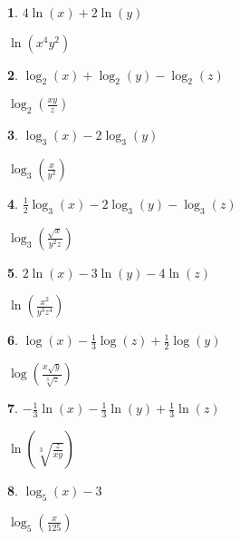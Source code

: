 \documentclass{amsbook}
\newtheorem{exc}{}
\newenvironment{ex}{\begin{exc}\normalfont}{\end{exc}}
\numberwithin{section}{chapter}
\numberwithin{equation}{chapter}
\begin{document}
\begin{multicols}{2}

\begin{ex}
	$4\ln(x) + 2\ln(y)$ 
	\begin{sol}
		$\ln(x^{4}y^{2})$
	\end{sol}
\end{ex}

\begin{ex}
	$\log_{2}(x) + \log_{2}(y) - \log_{2}(z)$
	\begin{sol}
	$\log_{2}\left(\frac{xy}{z}\right)$	
	\end{sol}
\end{ex}


\begin{ex}
	$\log_{3}(x) - 2 \log_{3}(y)$
	\begin{sol}
		$\log_{3} \left( \frac{x}{y^2} \right)$
	\end{sol}
\end{ex}


\begin{ex}
	$\frac{1}{2}\log_{3}(x) - 2\log_{3}(y) - \log_{3}(z)$
	\begin{sol}
		$\log_{3} \left( \frac{\sqrt{x}}{y^2z} \right)$
	\end{sol}
\end{ex}


\begin{ex}
	$2 \ln(x) -3 \ln(y) - 4\ln(z)$
	\begin{sol}
	$\ln\left( \frac{x^2}{y^3z^4} \right)$	
	\end{sol}
\end{ex}

\begin{ex}
	$\log(x) - \frac{1}{3} \log(z) + \frac{1}{2} \log(y)$
	\begin{sol}
	$\log\left(\frac{x \sqrt{y}}{\sqrt[3]{z}}  \right)$	
	\end{sol}
\end{ex}

\begin{ex}
	$-\frac{1}{3} \ln(x) - \frac{1}{3}\ln(y) + \frac{1}{3} \ln(z)$
	\begin{sol}
		$\ln\left(\sqrt[3]{\frac{z}{xy}}   \right)$
	\end{sol}
\end{ex}


\begin{ex}
	$\log_{5}(x) - 3$
	\begin{sol}
		$\log_{5}\left(\frac{x}{125}\right)$
	\end{sol}
\end{ex}



\end{multicols}
\end{document}
